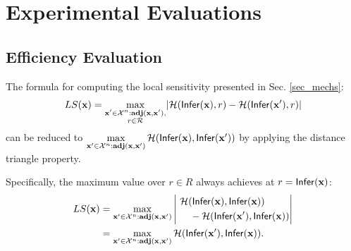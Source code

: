 \documentclass{article}
\begin{document}
\section{Experimental Evaluations}
\label{sec_experiment}

\subsection{Efficiency Evaluation}
\label{subsec_effi}
The formula for computing the local sensitivity presented in Sec. \ref{sec_mechs}: %
\[
LS(\textbf{x})=\max_{\substack{\textbf{x}' \in \mathcal{X}^n:\textbf{adj}(\textbf{x},\textbf{x}'),\\ r\in \mathcal{R}}}\lvert \mathcal{H}(\mathsf{Infer}(\textbf{x}), r) - \mathcal{H}(\mathsf{Infer}(\textbf{x}'), r)\rvert
\]
can be reduced to $\max\limits_{\textbf{x}' \in \mathcal{X}^n:\textbf{adj}(\textbf{x},\textbf{x}')}\mathcal{H}(\mathsf{Infer}(\textbf{x}), \mathsf{Infer}(\textbf{x}'))$
by applying the distance triangle property. 

Specifically, the maximum value over ${r \in R}$ always achieves at $r = \mathsf{Infer}(\textbf{x})$:
\begin{align*}
LS(\textbf{x})
& = \max\limits_{\textbf{x}' \in \mathcal{X}^n:\textbf{adj}(\textbf{x},\textbf{x}')}
\left|~
\begin{aligned}
&\mathcal{H}(\mathsf{Infer}(\textbf{x}), \mathsf{Infer}(\textbf{x}))\\
&\quad - \mathcal{H}(\mathsf{Infer}(\textbf{x}'), \mathsf{Infer}(\textbf{x}))
\end{aligned}
\right|\\
  & = \max\limits_{\textbf{x}' \in \mathcal{X}^n:\textbf{adj}(\textbf{x},\textbf{x}')}
\mathcal{H}(\mathsf{Infer}(\textbf{x}'), \mathsf{Infer}(\textbf{x})).
\end{align*}

\end{document}
